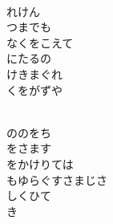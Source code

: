 \documentclass[10pt,b5j]{tarticle} %
\begin{document}
\vspace{1.5em} %
\newcommand{\linespace}{0.5em} %
\newcommand{\blocksize}{0.5\hsize} %
\newcommand{\itemmargin}{3em} %
\begin{enumerate} %
    \setlength{\itemindent}{\itemmargin} %
    \begin{minipage}[c]{\blocksize}
    
        \vspace{\linespace}
        \item~\\
        れけん\\
        つまでも\\
        なくをこえて\\
        にたるの\\
        けきまぐれ\\
        くをがずや
        
    \end{minipage}
    \begin{minipage}[c]{\blocksize}
        
        \vspace{\linespace}
        \item~\\
        ののをち\\
        をさます\\
        をかけりては\\
        もゆらぐすさまじさ\\
        しくひて\\
        き
        
    \end{minipage}
    \begin{minipage}[c]{\blocksize}
        

\end{minipage}
\end{enumerate}
\end{document}
